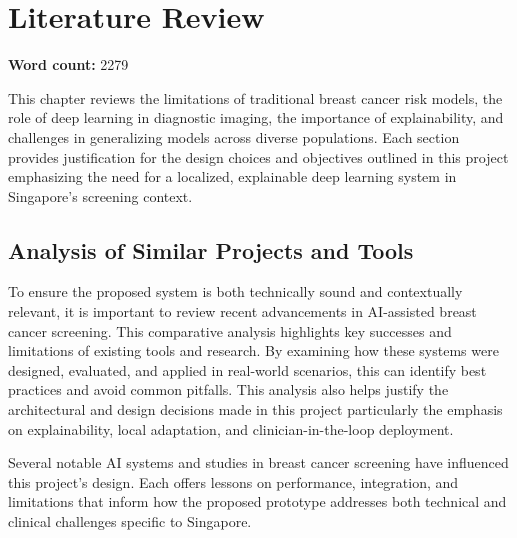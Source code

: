 \documentclass[12pt]{article}
\begin{document}
\newpage
\section{Literature Review}
\noindent\textbf{Word count:} 2279
\vspace{2em}

This chapter reviews the limitations of traditional breast cancer risk models, the role of deep learning in diagnostic imaging, the importance of explainability, and challenges in generalizing models across diverse populations. Each section provides justification for the design choices and objectives outlined in this project emphasizing the need for a localized, explainable deep learning system in Singapore's screening context.

\subsection{Analysis of Similar Projects and Tools}

To ensure the proposed system is both technically sound and contextually relevant, it is important to review recent advancements in AI-assisted breast cancer screening. This comparative analysis highlights key successes and limitations of existing tools and research. By examining how these systems were designed, evaluated, and applied in real-world scenarios, this can identify best practices and avoid common pitfalls. This analysis also helps justify the architectural and design decisions made in this project particularly the emphasis on explainability, local adaptation, and clinician-in-the-loop deployment.

Several notable AI systems and studies in breast cancer screening have influenced this project’s design. Each offers lessons on performance, integration, and limitations that inform how the proposed prototype addresses both technical and clinical challenges specific to Singapore.
\end{document}
